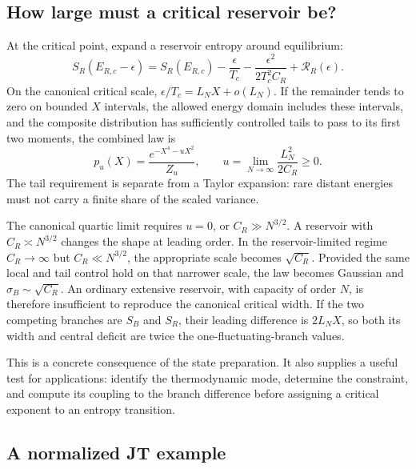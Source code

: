 \documentclass[11pt,letterpaper]{article}
\theoremstyle{plain}
\theoremstyle{definition}
\theoremstyle{remark}
\begin{document}
\subsection{How large must a critical reservoir be?}

At the critical point, expand a reservoir entropy around equilibrium:
\begin{equation}
 S_R(E_{R,c}-\epsilon)
 =S_R(E_{R,c})-\frac{\epsilon}{T_c}
  -\frac{\epsilon^2}{2T_c^2C_R}+\mathcal R_R(\epsilon).
 \label{eq09:critical_reservoir}
\end{equation}
On the canonical critical scale,
$\epsilon/T_c=L_NX+o(L_N)$. If the remainder tends to zero on bounded
$X$ intervals, the allowed energy domain includes these intervals, and the
composite distribution has sufficiently controlled tails to pass to its
first two moments, the combined law is
\begin{equation}
 p_u(X)=\frac{e^{-X^4-uX^2}}{Z_u},\qquad
 u=\lim_{N\to\infty}\frac{L_N^2}{2C_R}\geq0.
 \label{eq09:reservoir_quartic}
\end{equation}
The tail requirement is separate from a Taylor expansion: rare distant
energies must not carry a finite share of the scaled variance.

The canonical quartic limit requires $u=0$, or $C_R\gg N^{3/2}$.
A reservoir with $C_R\asymp N^{3/2}$ changes the shape at leading order.
In the reservoir-limited regime $C_R\to\infty$ but $C_R\ll N^{3/2}$,
the appropriate scale becomes $\sqrt{C_R}$. Provided the same local and
tail control hold on that narrower scale, the law becomes Gaussian and
$\sigma_B\sim\sqrt{C_R}$. An ordinary extensive reservoir, with capacity
of order $N$, is therefore insufficient to reproduce the canonical
critical width. If the two competing branches are $S_B$ and $S_R$, their
leading difference is $2L_NX$, so both its width and central deficit are
twice the one-fluctuating-branch values.

This is a concrete consequence of the state preparation. It also supplies
a useful test for applications: identify the thermodynamic mode, determine
the constraint, and compute its coupling to the branch difference before
assigning a critical exponent to an entropy transition.

\subsection{A normalized JT example}
\label{subsec09:jt_corrections}
\end{document}
